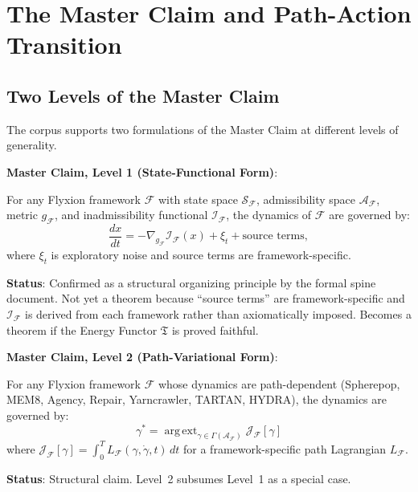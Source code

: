 \documentclass[11pt, a4paper]{book}
\theoremstyle{flyxion}
\theoremstyle{remark}
\begin{document}
\chapter{The Master Claim and Path-Action Transition}

\section{Two Levels of the Master Claim}

The corpus supports two formulations of the Master Claim at
different levels of generality.

\begin{masterbox}
\textbf{Master Claim, Level 1 (State-Functional Form)}:

For any Flyxion framework $\mathcal{F}$ with state space
$\mathcal{S}_\mathcal{F}$, admissibility space
$\mathcal{A}_\mathcal{F}$, metric $g_\mathcal{F}$, and
inadmissibility functional $\mathcal{I}_\mathcal{F}$, the
dynamics of $\mathcal{F}$ are governed by:
\[
\frac{dx}{dt} = -\nabla_{g_\mathcal{F}}
\mathcal{I}_\mathcal{F}(x) + \xi_t + \text{source terms},
\]
where $\xi_t$ is exploratory noise and source terms are
framework-specific.

\textbf{Status}: Confirmed as a structural organizing principle
by the formal spine document. Not yet a theorem because
``source terms'' are framework-specific and $\mathcal{I}_\mathcal{F}$
is derived from each framework rather than axiomatically imposed.
Becomes a theorem if the Energy Functor $\mathfrak{T}$ is proved
faithful.
\end{masterbox}

\begin{masterbox}
\textbf{Master Claim, Level 2 (Path-Variational Form)}:

For any Flyxion framework $\mathcal{F}$ whose dynamics are
path-dependent (Spherepop, MEM\textbar{}8, Agency, Repair,
Yarncrawler, TARTAN, HYDRA), the dynamics are governed by:
\[
\gamma^* = \operatorname{arg\,ext}_{\gamma \in \Gamma
(\mathcal{A}_\mathcal{F})} \mathcal{J}_\mathcal{F}[\gamma]
\]
where $\mathcal{J}_\mathcal{F}[\gamma] = \int_0^T
L_\mathcal{F}(\gamma,\dot\gamma,t)\,dt$ for a framework-specific
path Lagrangian $L_\mathcal{F}$.

\textbf{Status}: Structural claim. Level~2 subsumes Level~1 as
a special case.
\end{masterbox}
\end{document}

